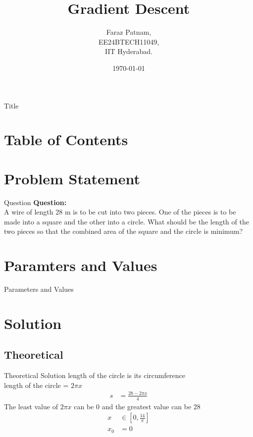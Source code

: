 \documentclass{beamer}
\title{Gradient Descent}
\author{Faraz Patnam,\\ EE24BTECH11049,\\IIT Hyderabad.\\}
\date{\today}
\providecommand{\sbrak}[1]{\ensuremath{{}\left[#1\right]}}
\theoremstyle{remark}
\numberwithin{equation}{section}
\begin{document}
\begin{frame}{Title}
    \titlepage
\end{frame}

\section*{Table of Contents}
\begin{frame}
    \tableofcontents
\end{frame}

\section{Problem Statement}
\begin{frame}{Question}
    \textbf{Question:}\\
A wire of length 28 m is to be cut into two pieces. One of the pieces is to be made into a square and the other into a circle. What should be the length of the two pieces so that the combined area of the square and the circle is minimum?\\
\end{frame}

\section{Paramters and Values}
\begin{frame}{Parameters and Values}
    \begin{table}[!ht]
    \centering
    
    \caption{Parameters or Values}
    \label{tab:my_label}
\end{table}
\end{frame}

\section{Solution}
\subsection{Theoretical}
\begin{frame}{Theoretical Solution}
    length of the circle is its circumference\\
    length of the circle = $2\pi x$
    \begin{align}
        s &= \frac{28 - 2\pi x}{4}
    \end{align}
    The least value of $2\pi x$ can be 0 and the greatest value can be 28
    \begin{align}
        x &\in \sbrak{0, \frac{14}{\pi}}\\
        x_0 &= 0
    \end{align}
\end{frame}
\end{document}
